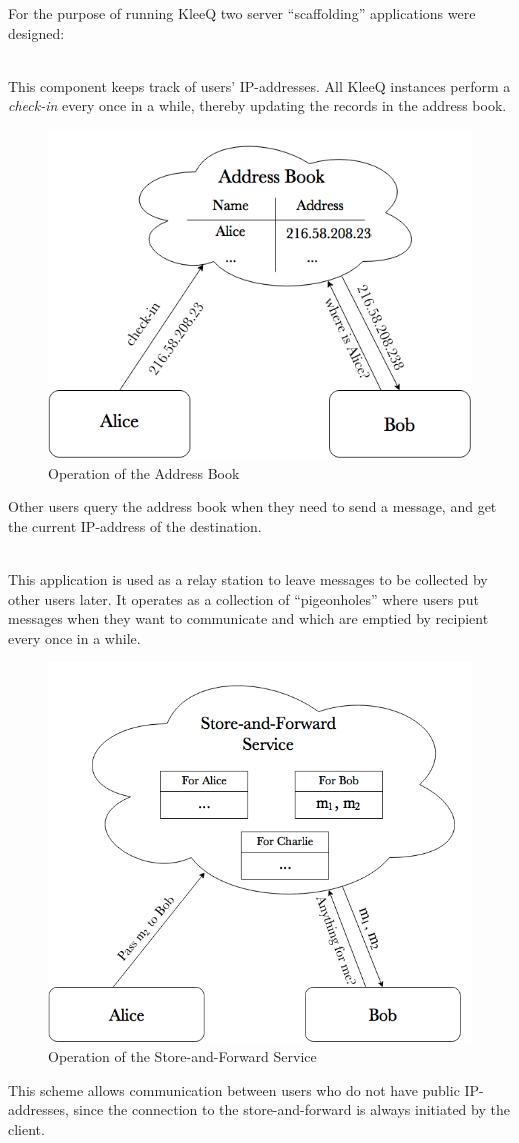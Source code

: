 \documentclass[a4paper, twoside, 12pt]{report}
\begin{document}
For the purpose of running KleeQ two server ``scaffolding'' applications were designed:
\begin{description}[labelindent=0.5cm, leftmargin=1.3cm, rightmargin=0.5cm]
    \item[Address Book]\hfill \\
        This component keeps track of users' IP-addresses. All KleeQ instances perform a \emph{check-in} every once in a while, thereby updating the records in the address book. 
        \begin{figure}[H]
            \centering
            \includegraphics[width = 0.6 \linewidth]{pics/addressBook.png}
            \caption{\label{fig:addressBook}Operation of the Address Book}
        \end{figure}
        Other users query the address book when they need to send a message, and get the current IP-address of the destination.

    \item[Store-and-Forward Service] \hfill \\
        This application is used as a relay station to leave messages to be collected by other users later. It operates as a collection of ``pigeonholes'' where users put messages when they want to communicate and which are emptied by recipient every once in a while. 
        \begin{figure}[H]
            \centering
            \includegraphics[width = 0.6 \linewidth]{pics/saf.png}
            \caption{\label{fig:addressBook}Operation of the Store-and-Forward Service}
        \end{figure}
        This scheme allows communication between users who do not have public IP-addresses, since the connection to the store-and-forward is always initiated by the client.
\end{description}
\end{document}
